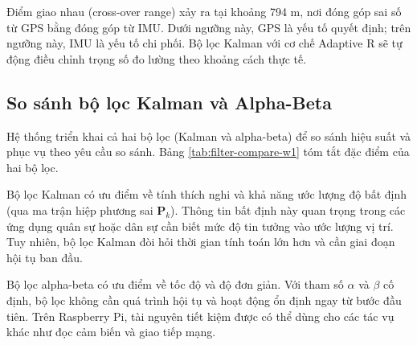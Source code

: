 Điểm giao nhau (cross-over range) xảy ra tại khoảng 794 m, nơi đóng góp sai số từ GPS bằng đóng góp từ IMU. Dưới ngưỡng này, GPS là yếu tố quyết định; trên ngưỡng này, IMU là yếu tố chi phối. Bộ lọc Kalman với cơ chế Adaptive R sẽ tự động điều chỉnh trọng số đo lường theo khoảng cách thực tế.

\subsection{So sánh bộ lọc Kalman và Alpha-Beta}

\hspace{0.5cm} Hệ thống triển khai cả hai bộ lọc (Kalman và alpha-beta) để so sánh hiệu suất và phục vụ theo yêu cầu so sánh. Bảng \ref{tab:filter-compare-w1} tóm tắt đặc điểm của hai bộ lọc.

\begin{table}[H]
\centering
\caption{So sánh đặc điểm hai bộ lọc được triển khai}
\label{tab:filter-compare-w1}
\end{table}

Bộ lọc Kalman có ưu điểm về tính thích nghi và khả năng ước lượng độ bất định (qua ma trận hiệp phương sai $\mathbf{P}_k$). Thông tin bất định này quan trọng trong các ứng dụng quân sự hoặc dân sự cần biết mức độ tin tưởng vào ước lượng vị trí. Tuy nhiên, bộ lọc Kalman đòi hỏi thời gian tính toán lớn hơn và cần giai đoạn hội tụ ban đầu.

Bộ lọc alpha-beta có ưu điểm về tốc độ và độ đơn giản. Với tham số $\alpha$ và $\beta$ cố định, bộ lọc không cần quá trình hội tụ và hoạt động ổn định ngay từ bước đầu tiên. Trên Raspberry Pi, tài nguyên tiết kiệm được có thể dùng cho các tác vụ khác như đọc cảm biến và giao tiếp mạng.

